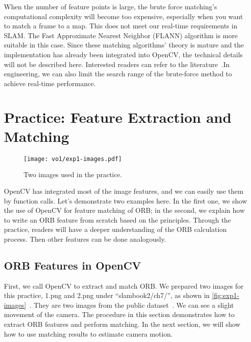 When the number of feature points is large, the brute force matching's computational complexity will become too expensive, especially when you want to match a frame to a map. This does not meet our real-time requirements in SLAM. The Fast Approximate Nearest Neighbor (FLANN) algorithm is more suitable in this case. Since these matching algorithms' theory is mature and the implementation has already been integrated into OpenCV, the technical details will not be described here. Interested readers can refer to the literature~\cite{Muja2009}.In engineering, we can also limit the search range of the brute-force method to achieve real-time performance.

\section{Practice: Feature Extraction and Matching}
\begin{figure}[!htp]
	\centering
	\texttt{[image: vo1/exp1-images.pdf]}
	\caption{Two images used in the practice.}
	\label{fig:exp1-images}
\end{figure}

OpenCV has integrated most of the image features, and we can easily use them by function calls. Let's demonstrate two examples here. In the first one, we show the use of OpenCV for feature matching of ORB; in the second, we explain how to write an ORB feature from scratch based on the principles. Through the practice, readers will have a deeper understanding of the ORB calculation process. Then other features can be done analogously.

\subsection{ORB Features in OpenCV}
First, we call OpenCV to extract and match ORB. We prepared two images for this practice, 1.png and 2.png under ``slambook2/ch7/'', as shown in \autoref{fig:exp1-images}~. They are two images from the public dataset~\cite{Sturm2012}. We can see a slight movement of the camera. The procedure in this section demonstrates how to extract ORB features and perform matching. In the next section, we will show how to use matching results to estimate camera motion.

